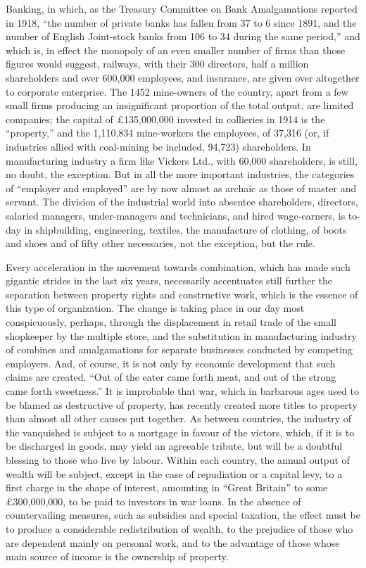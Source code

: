 \documentclass{book}
\begin{document}
Banking, in which, as the Treasury Committee on Bank Amalgamations reported in 1918, “the number of private banks has fallen from 37 to 6 since 1891, and the number of English Joint-stock banks from 106 to 34 during the same period,” and which is, in effect the monopoly of an even smaller number of firms than those figures would suggest, railways, with their 300 directors, half a million shareholders and over 600,000 employees, and insurance, are given over altogether to corporate enterprise. The 1452 mine-owners of the country, apart from a few small firms producing an insignificant proportion of the total output, are limited companies; the capital of £135,000,000 invested in collieries in 1914 is the “property,” and the 1,110,834 mine-workers the employees, of 37,316 (or, if industries allied with coal-mining be included, 94,723) shareholders. In manufacturing industry a firm like Vickers Ltd., with 60,000 shareholders, is still, no doubt, the exception. But in all the more important industries, the categories of “employer and employed” are by now almost as archaic as those of master and servant. The division of the industrial world into absentee shareholders, directors, salaried managers, under-managers and technicians, and hired wage-earners, is to-day in shipbuilding, engineering, textiles, the manufacture of clothing, of boots and shoes and of fifty other necessaries, not the exception, but the rule.

Every acceleration in the movement towards combination, which has made such gigantic strides in the last six years, necessarily accentuates still further the separation between property rights and constructive work, which is the essence of this type of organization. The change is taking place in our day most conspicuously, perhaps, through the displacement in retail trade of the small shopkeeper by the multiple store, and the substitution in manufacturing industry of combines and amalgamations for separate businesses conducted by competing employers. And, of course, it is not only by economic development that such claims are created. “Out of the eater came forth meat, and out of the strong came forth sweetness.” It is improbable that war, which in barbarous ages used to be blamed as destructive of property, has recently created more titles to property than almost all other causes put together. As between countries, the industry of the vanquished is subject to a mortgage in favour of the victors, which, if it is to be discharged in goods, may yield an agreeable tribute, but will be a doubtful blessing to those who live by labour. Within each country, the annual output of wealth will be subject, except in the case of repudiation or a capital levy, to a first charge in the shape of interest, amounting in “Great Britain” to some £300,000,000, to be paid to investors in war loans. In the absence of countervailing measures, such as subsidies and special taxation, the effect must be to produce a considerable redistribution of wealth, to the prejudice of those who are dependent mainly on personal work, and to the advantage of those whose main source of income is the ownership of property.
\end{document}
